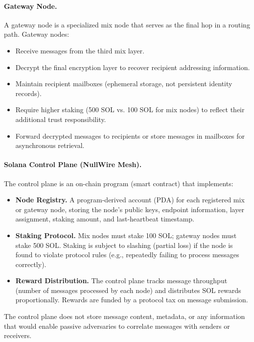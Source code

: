 \documentclass[11pt]{article}
\theoremstyle{definition}
\theoremstyle{remark}
\begin{document}
\paragraph{Gateway Node.} A gateway node is a specialized mix node that serves as the final hop in a routing path. Gateway nodes:
\begin{itemize}
    \item Receive messages from the third mix layer.
    \item Decrypt the final encryption layer to recover recipient addressing information.
    \item Maintain recipient mailboxes (ephemeral storage, not persistent identity records).
    \item Require higher staking (500 SOL vs. 100 SOL for mix nodes) to reflect their additional trust responsibility.
    \item Forward decrypted messages to recipients or store messages in mailboxes for asynchronous retrieval.
\end{itemize}

\paragraph{Solana Control Plane (NullWire Mesh).} The control plane is an on-chain program (smart contract) that implements:
\begin{itemize}
    \item \textbf{Node Registry.} A program-derived account (PDA) for each registered mix or gateway node, storing the node's public keys, endpoint information, layer assignment, staking amount, and last-heartbeat timestamp.

    \item \textbf{Staking Protocol.} Mix nodes must stake 100 SOL; gateway nodes must stake 500 SOL. Staking is subject to slashing (partial loss) if the node is found to violate protocol rules (e.g., repeatedly failing to process messages correctly).

    \item \textbf{Reward Distribution.} The control plane tracks message throughput (number of messages processed by each node) and distributes SOL rewards proportionally. Rewards are funded by a protocol tax on message submission.
\end{itemize}

The control plane does not store message content, metadata, or any information that would enable passive adversaries to correlate messages with senders or receivers.
\end{document}
